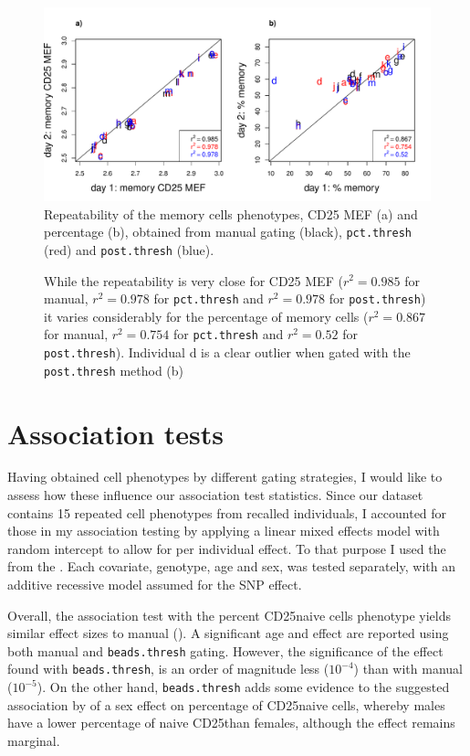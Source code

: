 \begin{figure}[h]
\centering
  \includegraphics[width=\textwidth]{figures/repeatability-memory-thresholds.pdf}
{Repeatability of the memory cells phenotypes, CD25 MEF (a) and percentage (b), obtained from manual gating (black), \texttt{pct.thresh} (red) and \texttt{post.thresh} (blue).}
{
  While the repeatability is very close for CD25 MEF
  ($r^2=0.985$ for manual, $r^2=0.978$ for \texttt{pct.thresh} and $r^2=0.978$ for \texttt{post.thresh})
  it varies considerably for the percentage of memory cells
  ($r^2=0.867$ for manual, $r^2=0.754$ for \texttt{pct.thresh} and $r^2=0.52$ for \texttt{post.thresh}).
  Individual d is a clear outlier when gated with the \texttt{post.thresh} method (b)

}
\end{figure}




\section{Association tests}

Having obtained cell phenotypes by different gating strategies, 
I would like to assess how these influence our association test statistics.
Since our dataset contains 15 repeated cell phenotypes from recalled individuals,
I accounted for those in my association testing 
by applying a linear mixed effects model with random intercept to allow for per individual effect.
To that purpose I used the  from the .
Each covariate, genotype, age and sex, was tested separately, with an additive recessive model assumed for the SNP effect.

Overall, the association test with the percent CD25\positive naive cells phenotype yields similar effect sizes to manual ().
A significant age and  effect are reported using both manual and \texttt{beads.thresh} gating.
However, the significance of the  effect found with \texttt{beads.thresh}, is an order of magnitude less ($10^{-4}$) than with manual ($10^{-5}$).
On the other hand, \texttt{beads.thresh} adds some evidence to the suggested association by \citet{Dendrou:2009dv} of a sex effect on percentage of CD25\positive naive cells,
whereby males have a lower percentage of naive CD25\positive than females, although the effect remains marginal.

